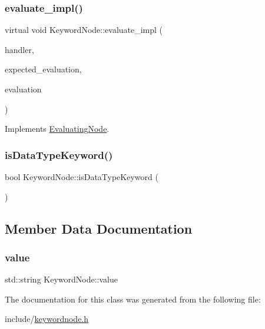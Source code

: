 \subsubsection{\texorpdfstring{evaluate\+\_\+impl()}{evaluate\_impl()}}
{\footnotesize\ttfamily virtual void Keyword\+Node\+::evaluate\+\_\+impl (\begin{DoxyParamCaption}\item[{\hyperlink{classSystemHandler}{System\+Handler} $\ast$}]{handler,  }\item[{\hyperlink{statics_8h_a6664c451ca7787483a7981cc1de68dbb}{E\+V\+A\+L\+U\+A\+T\+I\+O\+N\+\_\+\+T\+Y\+PE}}]{expected\+\_\+evaluation,  }\item[{struct \hyperlink{structEvaluation}{Evaluation} $\ast$}]{evaluation }\end{DoxyParamCaption})\hspace{0.3cm}{\ttfamily [virtual]}}



Implements \hyperlink{classEvaluatingNode_a085fa06e0b46a93c814dc55cda0c1b26}{Evaluating\+Node}.

\mbox{\label{classKeywordNode_a89ea6cb927bd569214b97ba0dff1ebec}} 
\subsubsection{\texorpdfstring{is\+Data\+Type\+Keyword()}{isDataTypeKeyword()}}
{\footnotesize\ttfamily bool Keyword\+Node\+::is\+Data\+Type\+Keyword (\begin{DoxyParamCaption}{ }\end{DoxyParamCaption})}



\subsection{Member Data Documentation}
\mbox{\label{classKeywordNode_aa70b672a2e216e214c595ee196f225ae}} 
\subsubsection{\texorpdfstring{value}{value}}
{\footnotesize\ttfamily std\+::string Keyword\+Node\+::value}



The documentation for this class was generated from the following file\+:\begin{DoxyCompactItemize}
\item 
include/\hyperlink{keywordnode_8h}{keywordnode.\+h}\end{DoxyCompactItemize}

